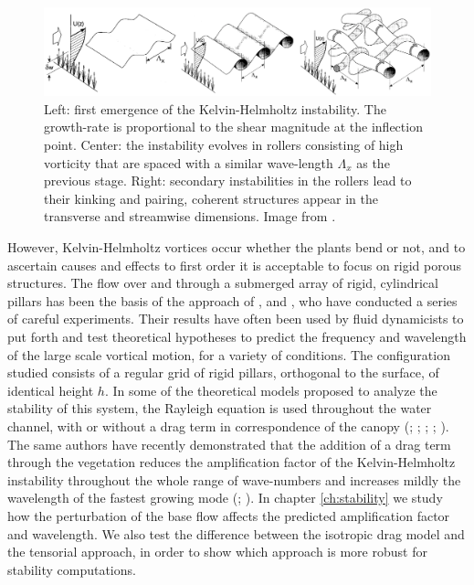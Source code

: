 \begin{figure}[h]
	\centering
	\includegraphics[width=1\linewidth]{chapter_1/finn}
	\caption{Left: first emergence of the Kelvin-Helmholtz instability. The growth-rate is proportional to the shear magnitude at the inflection point. Center: the instability evolves in rollers consisting of high vorticity that are spaced with a similar wave-length $\Lambda_x$ as the previous stage.  Right: secondary instabilities in the rollers lead to their kinking and pairing, coherent structures appear in the transverse and streamwise dimensions. Image from \citet{finnigan2000turbulence}.}
	\label{fig:monai_evol}
\end{figure}


However, Kelvin-Helmholtz vortices occur whether the plants bend or not, and to ascertain causes and effects to first order it is acceptable to focus on rigid porous structures.
The flow over and through a submerged array of rigid, cylindrical pillars has been the basis of the approach of \citet{ghisalberti2002mixing}, \citet{ghisalberti2004limited} and \citet{ghisalberti2005mass}, who have conducted a series of careful experiments. Their results have often been used by fluid dynamicists to put forth and test theoretical hypotheses to predict the frequency and wavelength of the large scale vortical motion, for a variety of conditions.
The configuration studied consists of a regular grid of rigid pillars, orthogonal to the surface, of identical height $h$.
In some of the theoretical models proposed to analyze the stability of this system, the Rayleigh equation is
used throughout the water channel, with or without a drag term in correspondence of the canopy (\citet{raupach1996coherent}; \citet{py2004mixing}; \citet{singh2016linear}; \citet{zampogna2016instability}; \citet{luminari2016drag}). The same authors have recently demonstrated that the addition of a drag term through the vegetation reduces the amplification factor of the Kelvin-Helmholtz instability throughout the whole range of wave-numbers and increases mildly the wavelength of the fastest growing mode (\citet{zampogna2016instability}; \citet{luminari2016drag}).
In chapter \ref{ch:stability} we study how the perturbation of the base flow affects the predicted amplification factor and wavelength. We also test the difference between the isotropic drag model and the tensorial approach, in order to show which approach is more robust for stability computations.


